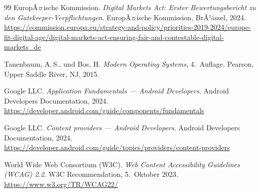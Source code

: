 ﻿\documentclass[12pt, a4paper]{article}
\begin{document}
\begin{thebibliography}{99}
EuropÃ¤ische Kommission.
\newblock \emph{Digital Markets Act: Erster Bewertungsbericht zu den Gatekeeper-Verpflichtungen}.
\newblock EuropÃ¤ische Kommission, BrÃ¼ssel, 2024.
\newblock \url{https://commission.europa.eu/strategy-and-policy/priorities-2019-2024/europe-fit-digital-age/digital-markets-act-ensuring-fair-and-contestable-digital-markets_de}

Tanenbaum, A.\,S., und Bos, H.
\newblock \emph{Modern Operating Systems}, 4.~Auflage.
\newblock Pearson, Upper Saddle River, NJ, 2015.

Google LLC.
\newblock \emph{Application Fundamentals --- Android Developers}.
\newblock Android Developers Documentation, 2024.
\newblock \url{https://developer.android.com/guide/components/fundamentals}

Google LLC.
\newblock \emph{Content providers --- Android Developers}.
\newblock Android Developers Documentation, 2024.
\newblock \url{https://developer.android.com/guide/topics/providers/content-providers}

World Wide Web Consortium (W3C).
\newblock \emph{Web Content Accessibility Guidelines (WCAG) 2.2}.
\newblock W3C Recommendation, 5.~Oktober 2023.
\newblock \url{https://www.w3.org/TR/WCAG22/}

\end{thebibliography}
\end{document}

